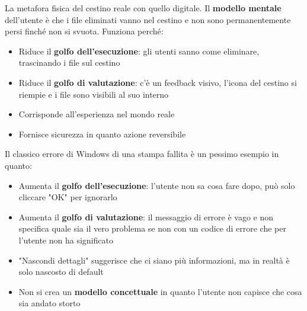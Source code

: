 \begin{example}[Cestino]
	La metafora fisica del cestino reale con quello digitale. Il \textbf{modello mentale} dell'utente è che i file eliminati vanno nel cestino e non sono permanentemente persi finché non si svuota. Funziona perché:
	\begin{itemize}
		\item Riduce il \textbf{golfo dell'esecuzione}: gli utenti sanno come eliminare, trascinando i file sul cestino
		\item Riduce il \textbf{golfo di valutazione}: c'è un feedback visivo, l'icona del cestino si riempie e i file sono visibili al suo interno
		\item Corrisponde all'esperienza nel mondo reale
		\item Fornisce sicurezza in quanto azione reversibile
	\end{itemize}
\end{example}

\begin{example}
	Il classico errore di Windows di una stampa fallita è un pessimo esempio in quanto:
	\begin{itemize}
		\item Aumenta il \textbf{golfo dell'esecuzione}: l'utente non sa cosa fare dopo, può solo cliccare "OK" per ignorarlo
		\item Aumenta il \textbf{golfo di valutazione}: il messaggio di errore è vago e non specifica quale sia il vero problema se non con un codice di errore che per l'utente non ha significato
		\item "Nascondi dettagli" suggerisce che ci siano più informazioni, ma in realtà è solo nascosto di default
		\item Non si crea un \textbf{modello concettuale} in quanto l'utente non capisce che cosa sia andato storto
	\end{itemize}
\end{example}

